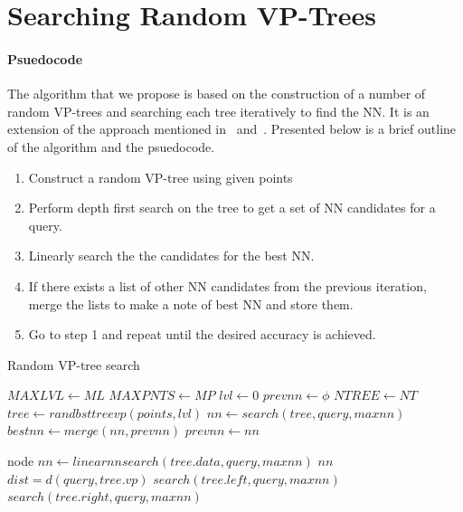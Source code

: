 \documentclass[11pt]{article}
\begin{document}
\section{Searching Random VP-Trees}
\paragraph{Psuedocode} The algorithm that we propose is based on the construction of a number of random VP-trees and searching each tree iteratively to find the NN. It is an extension of the approach mentioned in~\cite{Dasgupta15} and~\cite{Moon11}. Presented below is a brief outline of the algorithm and the psuedocode. 
\begin{enumerate}
\item Construct a random VP-tree using given points
\item Perform depth first search on the tree to get a set of NN candidates for a query.
\item Linearly search the the candidates for the best NN. 
\item If there exists a list of other NN candidates from the previous iteration, merge the lists to make a note of best NN and store them.
\item Go to step 1 and repeat until the desired accuracy is achieved. 
\end{enumerate}

\begin{algorithm}[h]
\caption{Random VP-tree search}
\label{alg:vp-treecsearch}
\begin{algorithmic}[1]
\State $MAXLVL \gets ML$
\State $MAXPNTS \gets MP$
\State $lvl \gets 0$
\State $prevnn \gets \phi$
\State $NTREE \gets NT$
\State $tree \gets randbsttreevp(points, lvl)$
\State $nn \gets search(tree, query, maxnn)$
\State $bestnn \gets merge(nn, prevnn)$
\State $prevnn \gets nn$
\EndFor
{}
\end{algorithmic}
\end{algorithm}

\begin{algorithm}[h]
\begin{algorithmic}[1]
\State \Return node
\EndProcedure
{}
\State $nn \gets linearnnsearch(tree.data, query, maxnn)$
\State \Return $nn$
\EndIf
\State $dist = d(query, tree.vp)$
\State \Return $search(tree.left, query, maxnn)$
\Else
\State \Return $search(tree.right, query, maxnn)$
\EndIf
\EndProcedure
\end{algorithmic}
\end{algorithm}
\end{document}
